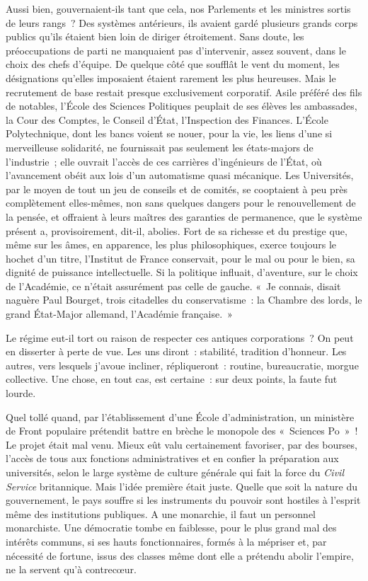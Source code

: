 \documentclass[french,twoside]{book} %
\begin{document}
Aussi bien, gouvernaient-ils tant que cela, nos Parlements et les ministres sortis de leurs rangs ? Des systèmes antérieurs, ils avaient gardé plusieurs grands corps publics qu’ils étaient bien loin de diriger étroitement. Sans doute, les préoccupations de parti ne manquaient pas d’intervenir, assez souvent, dans le choix des chefs d’équipe. De quelque côté que soufflât le vent du moment, les désignations qu’elles imposaient étaient rarement les plus heureuses. Mais le recrutement de base restait presque exclusivement corporatif. Asile préféré des fils de notables, l’École des Sciences Politiques peuplait de ses élèves les ambassades, la Cour des Comptes, le Conseil d’État, l’Inspection des Finances. L’École Polytechnique, dont les bancs voient se nouer, pour la vie, les liens d’une si merveilleuse solidarité, ne fournissait pas seulement les états-majors de l’industrie ; elle ouvrait l’accès de ces carrières d’ingénieurs de l’État, où l’avancement obéit aux lois d’un automatisme quasi mécanique. Les Universités, par le moyen de tout un jeu de conseils et de comités, se cooptaient à peu près complètement elles-mêmes, non sans quelques dangers pour le renouvellement   de la pensée, et offraient à leurs maîtres des garanties de permanence, que le système présent a, provisoirement, dit-il, abolies. Fort de sa richesse et du prestige que, même sur les âmes, en apparence, les plus philosophiques, exerce toujours le hochet d’un titre, l’Institut de France conservait, pour le mal ou pour le bien, sa dignité de puissance intellectuelle. Si la politique influait, d’aventure, sur le choix de l’Académie, ce n’était assurément pas celle de gauche. « Je connais, disait naguère Paul Bourget, trois citadelles du conservatisme : la Chambre des lords, le grand État-Major allemand, l’Académie française. »\par
Le régime eut-il tort ou raison de respecter ces antiques corporations ? On peut en disserter à perte de vue. Les uns diront : stabilité, tradition d’honneur. Les autres, vers lesquels j’avoue incliner, répliqueront : routine, bureaucratie, morgue collective. Une chose, en tout cas, est certaine : sur deux points, la faute fut lourde.\par
Quel tollé quand, par l’établissement d’une École d’administration, un ministère de Front populaire prétendit battre en brèche le monopole des « Sciences Po » ! Le projet était mal venu. Mieux eût valu certainement favoriser, par des bourses, l’accès de tous aux fonctions administratives et en confier la préparation aux universités, selon le large système de culture générale qui fait la force du \emph{Civil Service} britannique. Mais l’idée première était juste. Quelle que soit la nature du gouvernement, le pays souffre si les instruments du pouvoir sont hostiles à l’esprit même des institutions publiques. A une monarchie, il faut un personnel monarchiste. Une démocratie tombe en faiblesse, pour le plus grand mal des intérêts communs, si ses hauts fonctionnaires, formés à la mépriser et, par nécessité de fortune, issus des classes même dont elle a prétendu abolir l’empire, ne la servent qu’à contrecœur.\par
\end{document}
